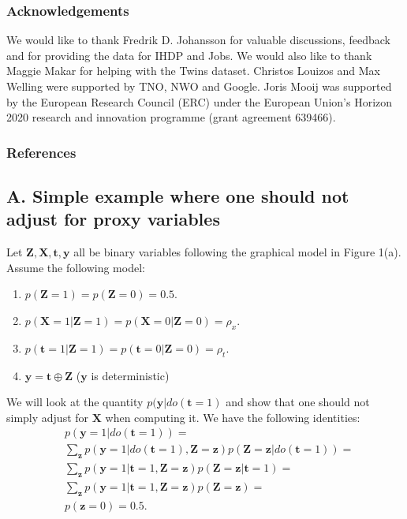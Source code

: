 \documentclass{article}
\def\*#1{\mathbf{#1}}
\begin{document}
 
\subsubsection*{Acknowledgements}
We would like to thank Fredrik D. Johansson for valuable discussions, feedback and for providing the data for IHDP and Jobs. We would also like to thank Maggie Makar for helping with the Twins dataset. Christos Louizos and Max Welling were supported by TNO, NWO and Google. Joris Mooij was supported by the European Research Council (ERC) under the European Union's Horizon 2020 research and innovation programme (grant agreement 639466).



\subsubsection*{References}
\begingroup
\renewcommand{\section}[2]{}{\small{

}}
\endgroup
\appendix
 \section*{Appendix}
 \subsection*{A. Simple example where one should not adjust for proxy variables}\label{appsec:simp}

Let $\*Z,\*X,\*t,\*y$ all be binary variables following the graphical model in Figure 1(a).
Assume the following model:
\begin{enumerate}
\item $p(\*Z=1) = p(\*Z=0) = 0.5$.
\item $p(\*X=1|\*Z=1) = p(\*X=0|\*Z=0) = \rho_x$.
\item $p(\*t=1|\*Z=1) = p(\*t=0|\*Z=0) = \rho_t$.
\item $\*y = \*t \oplus \*Z$ ($\*y$ is deterministic)
\end{enumerate}
We will look at the quantity $p(\*y|do(\*t=1)$ and show that one should not simply adjust for $\*X$ when computing it. 
We have the following identities:
\begin{align*}
&p(\*y=1|do(\*t=1)) = \\
&\sum_\*z p(\*y=1|do(\*t=1),\*Z=\*z)p(\*Z=\*z|do(\*t=1)) = \\
&\sum_\*z p(\*y=1|\*t=1,\*Z=\*z)p(\*Z=\*z|\*t=1) = \\
&\sum_\*z p(\*y=1|\*t=1,\*Z=\*z)p(\*Z=\*z) = \\
&p(\*z=0) = 0.5.
\end{align*}
\end{document}
